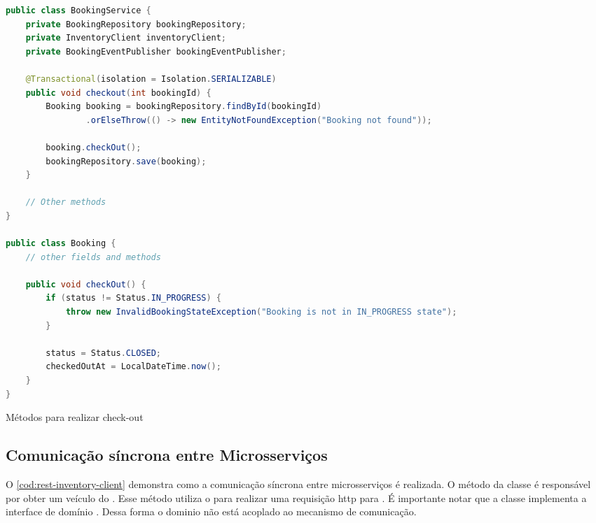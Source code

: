 \begin{codigo}[H]
    \begin{lstlisting}[language=Java]
public class BookingService {
    private BookingRepository bookingRepository;
    private InventoryClient inventoryClient;
    private BookingEventPublisher bookingEventPublisher;

    @Transactional(isolation = Isolation.SERIALIZABLE)
    public void checkout(int bookingId) {
        Booking booking = bookingRepository.findById(bookingId)
                .orElseThrow(() -> new EntityNotFoundException("Booking not found"));

        booking.checkOut();
        bookingRepository.save(booking);
    }

    // Other methods
}

public class Booking {
    // other fields and methods

    public void checkOut() {
        if (status != Status.IN_PROGRESS) {
            throw new InvalidBookingStateException("Booking is not in IN_PROGRESS state");
        }

        status = Status.CLOSED;
        checkedOutAt = LocalDateTime.now();
    }
}
    \end{lstlisting}
    \caption{Métodos para realizar check-out}
    \label{cod:realizar-check-out}
\end{codigo}

\subsection{Comunicação síncrona entre Microsserviços}
O \autoref{cod:rest-inventory-client} demonstra como a comunicação síncrona entre microsserviços é realizada. O método  da classe  é responsável por obter um veículo do . Esse método utiliza o  para realizar uma requisição \acrshort{http} para . É importante notar que a classe  implementa a interface de domínio . Dessa forma o dominio não está acoplado ao mecanismo de comunicação.

